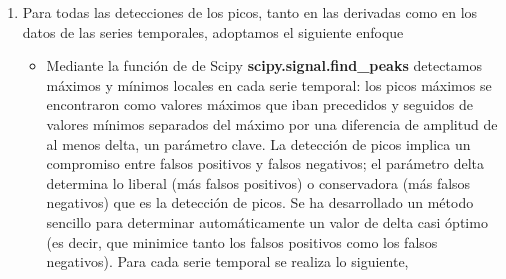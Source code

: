 \begin{enumerate}
	\item Para todas las detecciones de los picos, tanto en las  derivadas como en los datos de las series temporales, adoptamos el siguiente enfoque
	\begin{itemize}
		\item Mediante la función de  de Scipy   \textbf{scipy.signal.find\_peaks} detectamos máximos y mínimos locales en cada serie temporal: los picos máximos se encontraron como valores máximos que iban precedidos y seguidos de valores mínimos separados del máximo por una diferencia de amplitud de al menos delta, un parámetro clave.  La detección de picos implica un compromiso entre falsos positivos y falsos negativos; el parámetro delta determina lo liberal (más falsos positivos) o conservadora (más falsos negativos) que es la detección de picos. Se ha desarrollado un método sencillo para determinar automáticamente un valor de delta casi óptimo (es decir, que minimice tanto los falsos positivos como los falsos negativos). Para cada serie temporal   se realiza lo siguiente,  
		

\end{itemize}
\end{enumerate}
